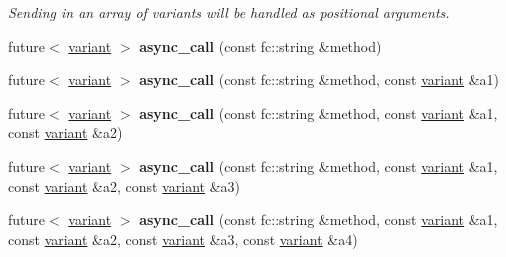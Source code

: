 \begin{Indent}
\begin{DoxyCompactItemize}
\begin{DoxyCompactList}\small\item\em Sending in an array of variants will be handled as positional arguments. \end{DoxyCompactList}\item 
\mbox{\label{classfc_1_1rpc_1_1json__connection_a151f2532ebac4861f330a5934a49988a}} 
future$<$ \mbox{\hyperlink{classfc_1_1variant}{variant}} $>$ {\bfseries async\+\_\+call} (const fc\+::string \&method)
\item 
\mbox{\label{classfc_1_1rpc_1_1json__connection_a3943b4c1485590db1b726141e16356bb}} 
future$<$ \mbox{\hyperlink{classfc_1_1variant}{variant}} $>$ {\bfseries async\+\_\+call} (const fc\+::string \&method, const \mbox{\hyperlink{classfc_1_1variant}{variant}} \&a1)
\item 
\mbox{\label{classfc_1_1rpc_1_1json__connection_a56ac1cf74ece75e5daf03e8eb45623e5}} 
future$<$ \mbox{\hyperlink{classfc_1_1variant}{variant}} $>$ {\bfseries async\+\_\+call} (const fc\+::string \&method, const \mbox{\hyperlink{classfc_1_1variant}{variant}} \&a1, const \mbox{\hyperlink{classfc_1_1variant}{variant}} \&a2)
\item 
\mbox{\label{classfc_1_1rpc_1_1json__connection_ac75ce5699299165aacf1cb63ced1f2e8}} 
future$<$ \mbox{\hyperlink{classfc_1_1variant}{variant}} $>$ {\bfseries async\+\_\+call} (const fc\+::string \&method, const \mbox{\hyperlink{classfc_1_1variant}{variant}} \&a1, const \mbox{\hyperlink{classfc_1_1variant}{variant}} \&a2, const \mbox{\hyperlink{classfc_1_1variant}{variant}} \&a3)
\item 
\mbox{\label{classfc_1_1rpc_1_1json__connection_a548899a67353e524ce04ae7bdb0c3738}} 
future$<$ \mbox{\hyperlink{classfc_1_1variant}{variant}} $>$ {\bfseries async\+\_\+call} (const fc\+::string \&method, const \mbox{\hyperlink{classfc_1_1variant}{variant}} \&a1, const \mbox{\hyperlink{classfc_1_1variant}{variant}} \&a2, const \mbox{\hyperlink{classfc_1_1variant}{variant}} \&a3, const \mbox{\hyperlink{classfc_1_1variant}{variant}} \&a4)
\item 
\mbox{\label{classfc_1_1rpc_1_1json__connection_aa3e4b8849b17f93cfea8992ec6b78504}} 

\end{DoxyCompactItemize}
\end{Indent}
